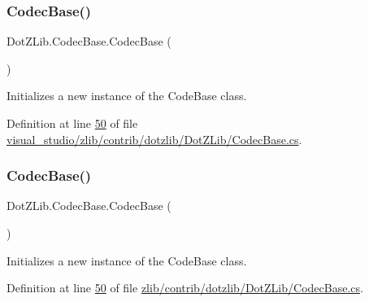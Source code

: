 \subsubsection{\texorpdfstring{Codec\+Base()}{CodecBase()}\hspace{0.1cm}{\footnotesize\ttfamily [1/2]}}
{\footnotesize\ttfamily Dot\+Z\+Lib.\+Codec\+Base.\+Codec\+Base (\begin{DoxyParamCaption}{ }\end{DoxyParamCaption})\hspace{0.3cm}{\ttfamily [inline]}}



Initializes a new instance of the {\ttfamily Code\+Base} class. 



Definition at line \hyperlink{visual__studio_2zlib_2contrib_2dotzlib_2_dot_z_lib_2_codec_base_8cs_source_l00050}{50} of file \hyperlink{visual__studio_2zlib_2contrib_2dotzlib_2_dot_z_lib_2_codec_base_8cs_source}{visual\+\_\+studio/zlib/contrib/dotzlib/\+Dot\+Z\+Lib/\+Codec\+Base.\+cs}.

\mbox{\label{class_dot_z_lib_1_1_codec_base_a1e372f5061c8f7c16a55bc41c55ebfa5}} 
\subsubsection{\texorpdfstring{Codec\+Base()}{CodecBase()}\hspace{0.1cm}{\footnotesize\ttfamily [2/2]}}
{\footnotesize\ttfamily Dot\+Z\+Lib.\+Codec\+Base.\+Codec\+Base (\begin{DoxyParamCaption}{ }\end{DoxyParamCaption})\hspace{0.3cm}{\ttfamily [inline]}}



Initializes a new instance of the {\ttfamily Code\+Base} class. 



Definition at line \hyperlink{zlib_2contrib_2dotzlib_2_dot_z_lib_2_codec_base_8cs_source_l00050}{50} of file \hyperlink{zlib_2contrib_2dotzlib_2_dot_z_lib_2_codec_base_8cs_source}{zlib/contrib/dotzlib/\+Dot\+Z\+Lib/\+Codec\+Base.\+cs}.



